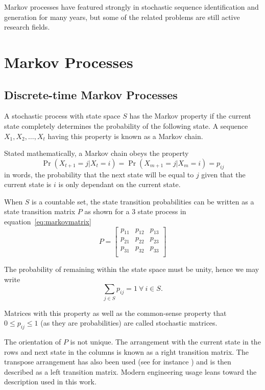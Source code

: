 Markov processes have featured strongly in stochastic sequence
identification and generation for many years, but some of the related
problems are still active research fields.

\section{Markov Processes}
\subsection{Discrete-time Markov Processes}
A stochastic process with state space $S$ has the Markov
property if the current state completely determines the probability of
the following state.  A sequence $X_1,X_2, \dots ,X_t$ having this
property is known as a Markov chain.

Stated mathematically, a Markov chain obeys the property
\begin{equation}
  \label{eq:markovproperty}
  \Pr(X_{t+1} = j|X_{t}=i) = \Pr(X_{m+1}=j|X_{m}=i)=p_{ij}
\end{equation}
in words, the probability that the next state will be equal to $j$ given
that the current state is $i$ is only dependant on the current state.

When $S$ is a countable set, the state transition probabilities can be written 
as a state transition matrix $P$ as shown for a 3 state process in
equation~\ref{eq:markovmatrix}
\begin{equation}
\label{eq:markovmatrix}
P = \left[ 
  \begin{array}{cccc}
    p_{11} & p_{12} & p_{13}\\
    p_{21} & p_{22} & p_{23}\\
    p_{31} & p_{32} & p_{33}\\
  \end{array} \right ]
\end{equation}

The probability of remaining within the state space must be unity,
hence we may write 
\begin{equation}
  \label{eq:rowsumone}
  \sum_{j\in S} p_{ij}=1~\forall~i \in S.
\end{equation}

Matrices with this property as well as the common-sense property
that $0 \leq p_{ij} \leq 1$ (as they are probabilities) are called
stochastic matrices.

The orientation of $P$ is not unique. The arrangement with the current
state in the rows and next state in the columns is known as a right
transition matrix. The transpose arrangement has also been used (see
for instance \citet{bhar_hidden_2004}) and is then described as a left
transition matrix. Modern engineering usage leans toward the
description used in this work.

